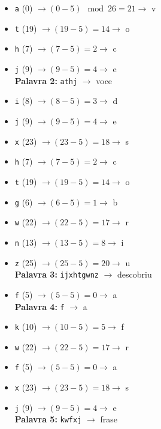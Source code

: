 \begin{itemize}
    \item \texttt{a} (0) \(\rightarrow (0 - 5) \mod 26 = 21 \rightarrow\) v
    \item \texttt{t} (19) \(\rightarrow (19 - 5) = 14 \rightarrow\) o
    \item \texttt{h} (7) \(\rightarrow (7 - 5) = 2 \rightarrow\) c
    \item \texttt{j} (9) \(\rightarrow (9 - 5) = 4 \rightarrow\) e \\
          \textbf{Palavra 2:} \texttt{athj} \(\rightarrow\) voce
\end{itemize}

\begin{itemize}
    \item \texttt{i} (8) \(\rightarrow (8 - 5) = 3 \rightarrow\) d
    \item \texttt{j} (9) \(\rightarrow (9 - 5) = 4 \rightarrow\) e
    \item \texttt{x} (23) \(\rightarrow (23 - 5) = 18 \rightarrow\) s
    \item \texttt{h} (7) \(\rightarrow (7 - 5) = 2 \rightarrow\) c
    \item \texttt{t} (19) \(\rightarrow (19 - 5) = 14 \rightarrow\) o
    \item \texttt{g} (6) \(\rightarrow (6 - 5) = 1 \rightarrow\) b
    \item \texttt{w} (22) \(\rightarrow (22 - 5) = 17 \rightarrow\) r
    \item \texttt{n} (13) \(\rightarrow (13 - 5) = 8 \rightarrow\) i
    \item \texttt{z} (25) \(\rightarrow (25 - 5) = 20 \rightarrow\) u \\
          \textbf{Palavra 3:} \texttt{ijxhtgwnz} \(\rightarrow\) descobriu
\end{itemize}

\begin{itemize}
    \item \texttt{f} (5) \(\rightarrow (5 - 5) = 0 \rightarrow\) a \\
          \textbf{Palavra 4:} \texttt{f} \(\rightarrow\) a
\end{itemize}

\begin{itemize}
    \item \texttt{k} (10) \(\rightarrow (10 - 5) = 5 \rightarrow\) f
    \item \texttt{w} (22) \(\rightarrow (22 - 5) = 17 \rightarrow\) r
    \item \texttt{f} (5) \(\rightarrow (5 - 5) = 0 \rightarrow\) a
    \item \texttt{x} (23) \(\rightarrow (23 - 5) = 18 \rightarrow\) s
    \item \texttt{j} (9) \(\rightarrow (9 - 5) = 4 \rightarrow\) e \\
          \textbf{Palavra 5:} \texttt{kwfxj} \(\rightarrow\) frase
\end{itemize}

